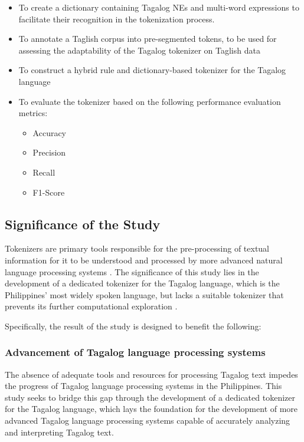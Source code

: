 \documentclass[journal]{./IEEE/IEEEtran}
\begin{document}
\begin{itemize}
  \item To create a dictionary containing Tagalog NEs and multi-word expressions to facilitate their recognition in the tokenization process. \\
  \item To annotate a Taglish corpus into pre-segmented tokens, to be used for assessing the adaptability of the Tagalog tokenizer on Taglish data \\
  \item To construct a hybrid rule and dictionary-based tokenizer for the Tagalog language \\
  \item To evaluate the tokenizer based on the following performance evaluation metrics:
    \begin{itemize}
        \item Accuracy
        \item Precision
        \item Recall
        \item F1-Score
    \end{itemize}
\end{itemize}

\subsection{Significance of the Study}

Tokenizers are primary tools responsible for the pre-processing of textual information for it to be understood and processed by more advanced natural language processing systems {\cite{Cutter}}. The significance of this study lies in the development of a dedicated tokenizer for the Tagalog language, which is the Philippines’ most widely spoken language, but lacks a suitable tokenizer that prevents its further computational exploration {\cite{TweetTaglish}}. \\

\newpage

Specifically, the result of the study is designed to benefit the following: \\

\subsubsection{Advancement of Tagalog language processing systems}

The absence of adequate tools and resources for processing Tagalog text impedes the progress of Tagalog language processing systems in the Philippines. This study seeks to bridge this gap through the development of a dedicated tokenizer for the Tagalog language, which lays the foundation for the development of more advanced Tagalog language processing systems capable of accurately analyzing and interpreting Tagalog text. \\
\end{document}
